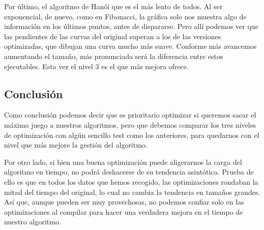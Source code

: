 \documentclass[a4paper, 11pt]{article}
\begin{document}
Por último, el algoritmo de Hanói que es el más lento de todos. Al ser exponencial, de nuevo, como en Fibonacci, la gráfica solo nos muestra algo de información en los últimos puntos, antes de dispararse. Pero allí podemos ver que las pendientes de las curvas del original superan a los de las versiones optimizadas, que dibujan una curva mucho más suave. Conforme más avancemos aumentando el tamaño, más pronunciada será la diferencia entre estos ejecutables. Esta vez el nivel 3 es el que más mejora ofrece.

\newpage
\subsection{Conclusión}
Como conclusión podemos decir que es prioritario optimizar si queremos sacar el máximo juego a nuestros algoritmos, pero que debemos comparar los tres niveles de optimización con algún sencillo test como los anteriores, para quedarnos con el nivel que más mejore la gestión del algoritmo.

Por otro lado, si bien una buena optimización puede aligerarnos la carga del algoritmo en tiempo, no podrá deshacerse de su tendencia asintótica. Prueba de ello es que en todos los datos que hemos recogido, las optimizaciones rondaban la mitad del tiempo del original, lo cual no cambia la tendencia en tamaños grandes. Así que, aunque pueden ser muy provechosas, no podemos confiar solo en las optimizaciones al compilar para hacer una verdadera mejora en el tiempo de nuestro algoritmo.
\end{document}
